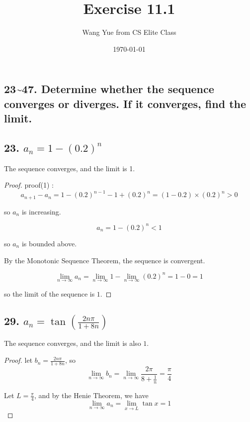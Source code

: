 \documentclass{article}
\begin{document}
    \title{Exercise 11.1}
    \author{Wang Yue from CS Elite Class}
    \date{\today}
    \maketitle

    \subsection*{23\textasciitilde 47. Determine whether the sequence converges or diverges. If it converges, find the limit.}

    \subsection*{23. $a_n = 1 - (0.2) ^ n$}
        The sequence converges, and the limit is 1.
    \begin{proof}

        proof(1) :$$a_{n + 1} - a_n = 1 - (0.2)^{n - 1} - 1 + (0.2)^n = (1 - 0.2) \times (0.2)^n > 0$$

        so $a_n$ is increasing.

        $$a_n = 1 - (0.2)^n < 1$$

        so $a_n$ is bounded above.

        By the Monotonic Sequence Theorem, the sequence is convergent.

        $$\lim_{n \to \infty}a_n = \lim_{n \to \infty}1 - \lim_{n \to \infty}(0.2)^n = 1 - 0 = 1$$

        so the limit of the sequence is $1$.

    \end{proof}
    \subsection*{29. $a_n = \tan(\frac{2n\pi}{1 + 8n})$}
    The sequence converges,  and the limit is also $1$.
    \begin{proof}
        let $b_n = \frac{2n\pi}{1  + 8n}$, so $$\lim_{n \to \infty}b_n = \lim_{n \to \infty}\frac{2\pi}{8 + \frac{1}{n}} = \frac{\pi}{4}$$
        

        Let $L = \frac{\pi}{4}$, and by the Henie Theorem, we have $$\lim_{n \to \infty} a_n = \lim_{x \to L}\tan x = 1$$
    \end{proof}
    
\end{document}
